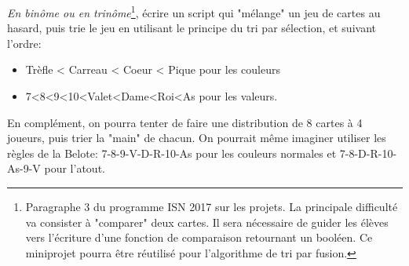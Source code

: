 \documentclass{article}
\begin{document}
\medskip

\emph{En binôme ou en trinôme}\footnote{Paragraphe 3 du programme ISN 2017 sur les projets. La principale difficulté va consister à "comparer" deux cartes. Il sera nécessaire de guider les élèves vers l'écriture d'une fonction de comparaison retournant un booléen. Ce miniprojet pourra être réutilisé pour l'algorithme de tri par fusion.}, écrire un script qui "mélange" un jeu de cartes au hasard,  puis trie le jeu en utilisant le principe du tri par sélection, et suivant l'ordre:
\begin{itemize}
	\item Trèfle < Carreau < Coeur < Pique pour les couleurs
	\item 7<8<9<10<Valet<Dame<Roi<As pour les valeurs.
\end{itemize}

  
	
	

En complément, on pourra tenter de faire une distribution de 8 cartes à 4 joueurs, puis trier la "main" de chacun. On pourrait même imaginer utiliser les règles de la Belote: 7-8-9-V-D-R-10-As pour les couleurs normales et 7-8-D-R-10-As-9-V pour l'atout.
\end{document}
